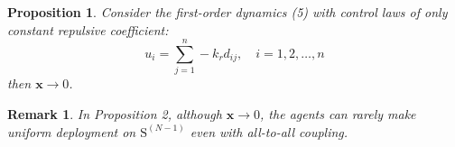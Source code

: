 \documentclass{article}
\newtheorem{proposition}[theorem]{Proposition}
\newtheorem{remark}[theorem]{Remark}
\begin{document}
\begin{proposition}
Consider the first-order dynamics (5) with control laws of only constant repulsive coefficient:
\begin{equation}
u_i = \sum_{j=1}^n -k_r d_{ij}, \quad i = 1,2,\dots,n
\end{equation}
then $\boldsymbol{x} \to 0$.
\end{proposition}

\begin{remark}
In Proposition 2, although $\boldsymbol{x} \to 0$, the agents can rarely make uniform deployment on $\mathrm{S}^{(N-1)}$ even with all-to-all coupling.
\end{remark}
\end{document}
